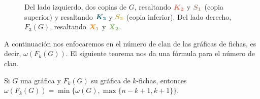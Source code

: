 \begin{figure}[ht!]
\caption{Del lado izquierdo, dos copias de $G$, resaltando
${\color{salmon}\boldsymbol {K_2}}$ y ${\color{baige}\boldsymbol {S_1}}$ (copia
superior) y resaltando ${\color{azulOscuro}\boldsymbol {K_2}}$ y
${\color{oro}\boldsymbol {S_2}}$ (copia inferior). Del lado derecho, $F_3(G)$,
resaltando ${\color{naranja}\boldsymbol {X_1}}$ y ${\color{verde}\boldsymbol
{X_2}}$.}
\label{fig:ex-clique2}
\end{figure}
       
A continuaci\'on nos enfocaremos en el n\'umero de clan de las gr\'aficas de
fichas, es decir, $\omega(F_k(G))$. El siguiente teorema nos da una f\'ormula
para el n\'umero de clan.
            
\begin{teorema}
\label{teo:clan-max}
    Si $G$ una gr\'afica y $F_k(G)$ su gr\'afica de $k$-fichas, entonces
    $\omega(F_k(G))= \min \{\omega(G), \max \{n-k+1,k+1\}\}$.
\end{teorema}

